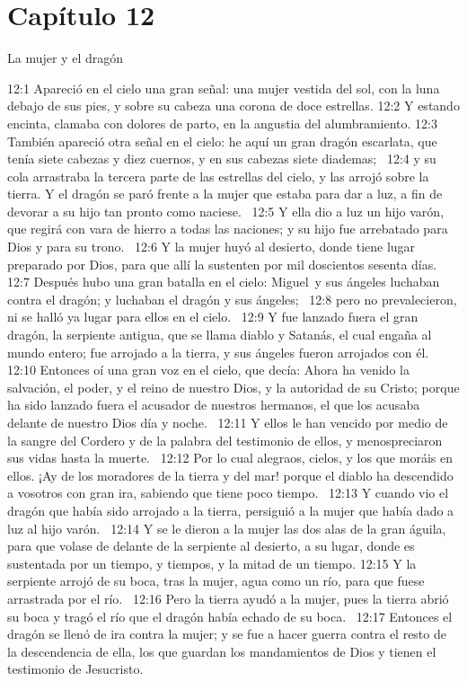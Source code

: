 \section*{Capítulo 12 }
La mujer y el dragón  

12:1 Apareció en el cielo una gran señal: una mujer vestida del sol, con la luna debajo de sus pies, y sobre su cabeza una corona de doce estrellas. 
12:2 Y estando encinta, clamaba con dolores de parto, en la angustia del alumbramiento. 
12:3 También apareció otra señal en el cielo: he aquí un gran dragón escarlata, que tenía siete cabezas y diez cuernos, y en sus cabezas siete diademas;  
12:4 y su cola arrastraba la tercera parte de las estrellas del cielo, y las arrojó sobre la tierra. Y el dragón se paró frente a la mujer que estaba para dar a luz, a fin de devorar a su hijo tan pronto como naciese.  
12:5 Y ella dio a luz un hijo varón, que regirá con vara de hierro a todas las naciones; y su hijo fue arrebatado para Dios y para su trono.  
12:6 Y la mujer huyó al desierto, donde tiene lugar preparado por Dios, para que allí la sustenten por mil doscientos sesenta días.  
12:7 Después hubo una gran batalla en el cielo: Miguel y sus ángeles luchaban contra el dragón; y luchaban el dragón y sus ángeles;  
12:8 pero no prevalecieron, ni se halló ya lugar para ellos en el cielo.  
12:9 Y fue lanzado fuera el gran dragón, la serpiente antigua, que se llama diablo y Satanás, el cual engaña al mundo entero; fue arrojado a la tierra, y sus ángeles fueron arrojados con él.  
12:10 Entonces oí una gran voz en el cielo, que decía: Ahora ha venido la salvación, el poder, y el reino de nuestro Dios, y la autoridad de su Cristo; porque ha sido lanzado fuera el acusador de nuestros hermanos, el que los acusaba delante de nuestro Dios día y noche.  
12:11 Y ellos le han vencido por medio de la sangre del Cordero y de la palabra del testimonio de ellos, y menospreciaron sus vidas hasta la muerte.  
12:12 Por lo cual alegraos, cielos, y los que moráis en ellos. ¡Ay de los moradores de la tierra y del mar! porque el diablo ha descendido a vosotros con gran ira, sabiendo que tiene poco tiempo.  
12:13 Y cuando vio el dragón que había sido arrojado a la tierra, persiguió a la mujer que había dado a luz al hijo varón.  
12:14 Y se le dieron a la mujer las dos alas de la gran águila, para que volase de delante de la serpiente al desierto, a su lugar, donde es sustentada por un tiempo, y tiempos, y la mitad de un tiempo. 
12:15 Y la serpiente arrojó de su boca, tras la mujer, agua como un río, para que fuese arrastrada por el río.  
12:16 Pero la tierra ayudó a la mujer, pues la tierra abrió su boca y tragó el río que el dragón había echado de su boca.  
12:17 Entonces el dragón se llenó de ira contra la mujer; y se fue a hacer guerra contra el resto de la descendencia de ella, los que guardan los mandamientos de Dios y tienen el testimonio de Jesucristo.  

